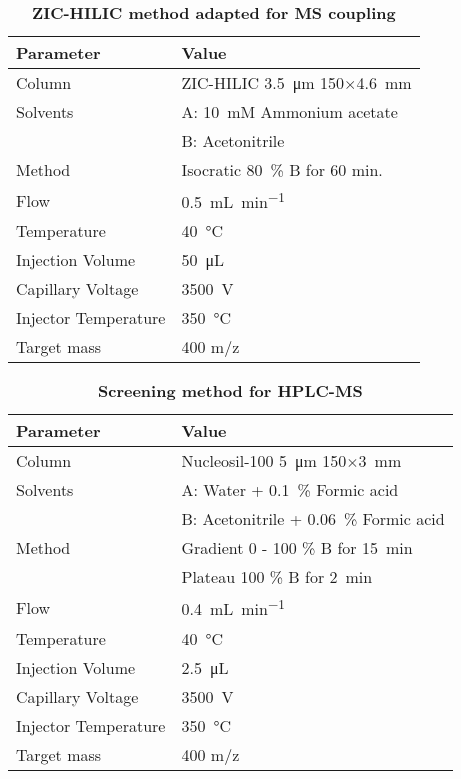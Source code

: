 	\begin{table}[htbp]
		\caption[ZIC-HILIC method adapted for MS coupling]{\textbf{ZIC-HILIC method adapted for MS coupling}}
		\label{tab:method_hilic_ms}
		\centering
		\begin{tabularx}{\textwidth}{XX}
			\toprule
			\textbf{Parameter}	& \textbf{Value}	\\
			\midrule
			Column 		& ZIC-HILIC \SI{3.5}{\micro\meter} 150$\times$\SI{4.6}{\milli\meter} 	\\
			Solvents	& A: 	10~mM Ammonium acetate 	\\
						& B: 	Acetonitrile 			\\
			Method 		& Isocratic 80~\% B for 60 min. 	\\
			Flow 		& \SI{0.5}{\milli\liter\per\minute} \\
			Temperature & \SI{40}{\celsius} 	\\
			Injection Volume 	& \SI{50}{\micro\liter} 	\\
			\midrule
			Capillary Voltage 		& \SI{3500}{\volt} 	\\
			Injector Temperature	& \SI{350}{\celsius}\\
			Target mass 			& 400 m/z 			\\
			\bottomrule
		\end{tabularx}
	\end{table}

	\begin{table}[htbp]
		\caption[Screening method for HPLC-MS]{\textbf{Screening method for HPLC-MS}}
		\label{tab:method_ms_1}
		\centering
		\begin{tabularx}{\textwidth}{XX}
			\toprule
			\textbf{Parameter}	& \textbf{Value}	\\
			\midrule
			Column 		& Nucleosil-100 \SI{5}{\micro\meter} 150$\times$\SI{3}{\milli\meter} 	\\
			Solvents	& A: Water + 0.1~\% Formic acid 	\\
						& B: Acetonitrile + 0.06~\% Formic acid		\\
			Method 		& Gradient 0 - 100 \% B for \SI{15}{\minute} 	\\
						& Plateau 100 \% B for \SI{2}{\minute} 	\\
			Flow 		& \SI{0.4}{\milli\liter\per\minute} \\
			Temperature & \SI{40}{\celsius} 	\\
			Injection Volume 	& \SI{2.5}{\micro\liter} 	\\
			\midrule
			Capillary Voltage 	& \SI{3500}{\volt} 	\\
			Injector Temperature& \SI{350}{\celsius}\\
			Target mass 		& 400 m/z 			\\
			\bottomrule
		\end{tabularx}
	\end{table}

